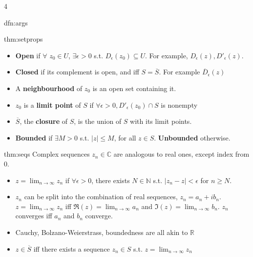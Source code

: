\documentclass[landscape, 8pt]{extarticle}
\begin{document}
\begin{multicols*}{4}
\begin{dfn}{dfn:args}{ }
		\end{dfn}
		
		
		\begin{thm}{thm:setprops}{ }
			\begin{itemize}
				\item \textbf{Open} if $\forall$ $z_0 \in U$, $\exists \epsilon > 0$ s.t. $D_\epsilon(z_0) \subseteq U$. For example, $D_\epsilon(z), D'_\epsilon(z)$.
				\item \textbf{Closed} if its complement is open, and iff $S = \overline{S}$. For example $\overline{D}_\epsilon(z)$
				\item A \textbf{neighbourhood} of $z_0$ is an open set containing it.
				\item $z_0$ is a \textbf{limit point} of $S$ if $\forall \epsilon > 0, D'_\epsilon(z_0) \cap S$ is nonempty
				\item $\overline{S}$, the \textbf{closure} of $S$, is the union of $S$ with its limit points.
				\item \textbf{Bounded} if $\exists M>0$ s.t. $\left|z\right| \le M$, for all $z \in S$. \textbf{Unbounded} otherwise.
			\end{itemize}	
			
		\end{thm}
		
		
		\begin{dfn}{thm:seqs}{ }
			Complex sequences $z_n \in \mathbb{C}$ are analogous to real ones, except index from $0$.
			\begin{itemize}
				\item $z = \lim_{n\to \infty}z_n$ if $\forall \epsilon > 0$, there exists $N \in \mathbb{N}$ s.t. $\left|z_n - z\right| <\epsilon$ for $n \ge N$.
				\item $z_n$ can be split into the combination of real sequences, $z_n = a_n + ib_n$. $z = \lim_{n\to \infty}z_n$ iff $\Re(z) = \lim_{n\to \infty} a_n$ and $\Im(z) = \lim_{n\to \infty} b_n$. $z_n$ converges iff $a_n$ and $b_n$ converge.
				\item Cauchy, Bolzano-Weierstrass, boundedness are all akin to $\mathbb{R}$
				\item $z \in \overline{S}$ iff there exists a sequence $z_n \in S$ s.t. $z = \lim_{n\to \infty} z_n$
			\end{itemize}
			
		\end{dfn}
		

\end{multicols*}
\end{document}
